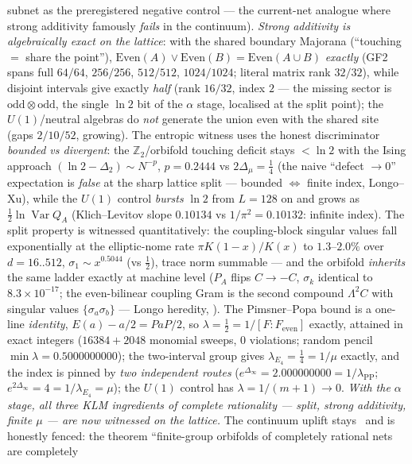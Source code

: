 \documentclass[11pt,a4paper]{article}
\newcommand{\Z}{\mathbb Z}
\begin{document}
\begin{itemize}
\begin{itemize}
subnet as the preregistered negative control --- the current-net analogue where strong additivity
famously \emph{fails} in the continuum). \emph{Strong additivity is algebraically exact on the
lattice}: with the shared boundary Majorana (``touching $=$ share the point''),
$\mathrm{Even}(A)\vee\mathrm{Even}(B)=\mathrm{Even}(A\cup B)$ \emph{exactly} (GF2 spans full
$64/64$, $256/256$, $512/512$, $1024/1024$; literal matrix rank $32/32$), while disjoint intervals
give exactly \emph{half} (rank $16/32$, index $2$ --- the missing sector is
$\mathrm{odd}\otimes\mathrm{odd}$, the single $\ln2$ bit of the $\alpha$ stage, localised at the
split point); the $U(1)$/neutral algebras do \emph{not} generate the union even with the shared site
(gaps $2/10/52$, growing). The entropic witness uses the honest discriminator \emph{bounded vs
divergent}: the $\Z_2$/orbifold touching deficit stays $<\ln2$ with the Ising approach
$(\ln2-\Delta_2)\sim N^{-p}$, $p=0.2444$ vs $2\Delta_\mu=\tfrac14$ (the naive ``defect $\to0$''
expectation is \emph{false} at the sharp lattice split --- bounded $\Leftrightarrow$ finite index,
Longo--Xu), while the $U(1)$ control \emph{bursts} $\ln2$ from $L=128$ on and grows as
$\tfrac12\ln\operatorname{Var}Q_A$ (Klich--Levitov slope $0.10134$ vs $1/\pi^2=0.10132$: infinite
index). The split property is witnessed quantitatively: the coupling-block singular values fall
exponentially at the elliptic-nome rate $\pi K(1-x)/K(x)$ to $1.3$--$2.0\%$ over $d=16..512$,
$\sigma_1\sim x^{0.5044}$ (vs $\tfrac12$), trace norm summable --- and the orbifold \emph{inherits}
the same ladder exactly at machine level ($P_A$ flips $C\to-C$, $\sigma_k$ identical to
$8.3\times10^{-17}$; the even-bilinear coupling Gram is the second compound $\Lambda^2C$ with
singular values $\{\sigma_a\sigma_b\}$ --- Longo heredity, \mC). The Pimsner--Popa bound is a
one-line \emph{identity}, $E(a)-a/2=PaP/2$, so $\lambda=\tfrac12=1/[F:F_{\mathrm{even}}]$ exactly,
attained in exact integers ($16384+2048$ monomial sweeps, $0$ violations; random pencil
$\min\lambda=0.5000000000$); the two-interval group gives $\lambda_{E_4}=\tfrac14=1/\mu$ exactly,
and the index is pinned by \emph{two independent routes}
($e^{\Delta_\infty}=2.000000000=1/\lambda_{\mathrm{PP}}$;
$e^{2\Delta_\infty}=4=1/\lambda_{E_4}=\mu$); the $U(1)$ control has $\lambda=1/(m{+}1)\to0$.
\emph{With the $\alpha$ stage, all three KLM ingredients of complete rationality --- split, strong
additivity, finite $\mu$ --- are now witnessed on the lattice.} The continuum uplift stays \mO\ and
is honestly fenced: the theorem ``finite-group orbifolds of completely rational nets are completely

\end{itemize}
\end{itemize}
\end{document}
